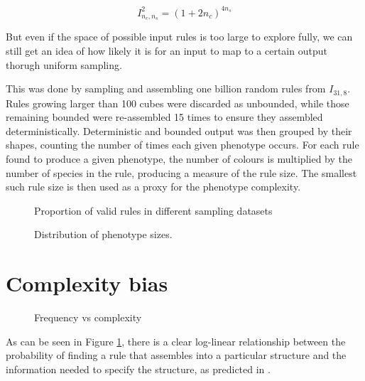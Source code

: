 \[
I_{n_c, n_s}^2 = (1+2n_c)^{4n_s}
\]

But even if the space of possible input rules is too large to explore fully, we can still get an idea of how likely it is for an input to map to a certain output thorugh uniform sampling.

This was done by sampling and assembling one billion random rules from \(I_{31, 8}\). Rules growing larger than 100 cubes were discarded as unbounded, while those remaining bounded were re-assembled 15 times to ensure they assembled deterministically. Deterministic and bounded output was then grouped by their shapes, counting the number of times each given phenotype occurs. For each rule found to produce a given phenotype, the number of colours is multiplied by the number of species in the rule, producing a measure of the rule size. The smallest such rule size is then used as a proxy for the phenotype complexity.

\begin{figure}[h]
    \centering
    \caption{Proportion of valid rules in different sampling datasets}
\end{figure}


\begin{figure}[h]
    \centering
    \caption{Distribution of phenotype sizes.}
\end{figure}


\section{Complexity bias}

\begin{figure}[h]
    \centering
    \centering
    \centering
    \centering
    \caption{Frequency vs complexity}
    \label{fig:freq_vs_compl}
\end{figure}

As can be seen in Figure \ref{fig:freq_vs_compl}, there is a clear log-linear relationship between the probability of finding a rule that assembles into a particular structure and the information needed to specify the structure, as predicted in \cite{dingle2018input, dingle2020generic}.

